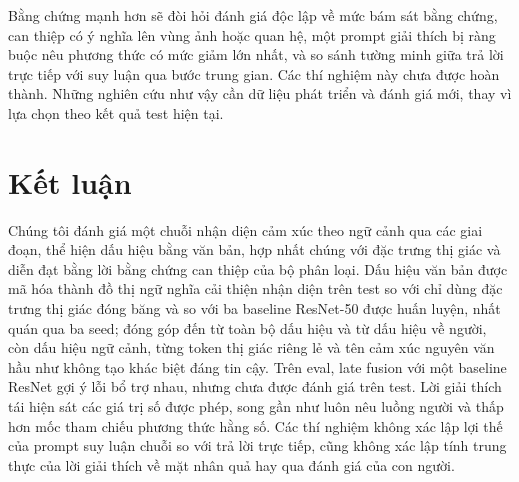 \documentclass[conference]{IEEEtran}
\begin{document}
Bằng chứng mạnh hơn sẽ đòi hỏi đánh giá độc lập về mức bám sát bằng chứng, can thiệp có ý nghĩa lên vùng ảnh hoặc quan hệ, một prompt giải thích bị ràng buộc nêu phương thức có mức giảm lớn nhất, và so sánh tường minh giữa trả lời trực tiếp với suy luận qua bước trung gian. Các thí nghiệm này chưa được hoàn thành. Những nghiên cứu như vậy cần dữ liệu phát triển và đánh giá mới, thay vì lựa chọn theo kết quả test hiện tại.

\section{Kết luận}\label{sec:conclusion}
Chúng tôi đánh giá một chuỗi nhận diện cảm xúc theo ngữ cảnh qua các giai đoạn, thể hiện dấu hiệu bằng văn bản, hợp nhất chúng với đặc trưng thị giác và diễn đạt bằng lời bằng chứng can thiệp của bộ phân loại. Dấu hiệu văn bản được mã hóa thành đồ thị ngữ nghĩa cải thiện nhận diện trên test so với chỉ dùng đặc trưng thị giác đóng băng và so với ba baseline ResNet-50 được huấn luyện, nhất quán qua ba seed; đóng góp đến từ toàn bộ dấu hiệu và từ dấu hiệu về người, còn dấu hiệu ngữ cảnh, từng token thị giác riêng lẻ và tên cảm xúc nguyên văn hầu như không tạo khác biệt đáng tin cậy. Trên eval, late fusion với một baseline ResNet gợi ý lỗi bổ trợ nhau, nhưng chưa được đánh giá trên test. Lời giải thích tái hiện sát các giá trị số được phép, song gần như luôn nêu luồng người và thấp hơn mốc tham chiếu phương thức hằng số. Các thí nghiệm không xác lập lợi thế của prompt suy luận chuỗi so với trả lời trực tiếp, cũng không xác lập tính trung thực của lời giải thích về mặt nhân quả hay qua đánh giá của con người.



\end{document}
